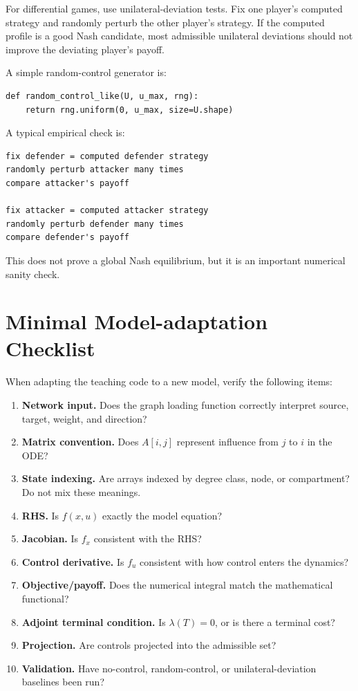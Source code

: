 \documentclass[11pt,a4paper]{article}
\begin{document}
For differential games, use unilateral-deviation tests. Fix one player's computed strategy and randomly perturb the other player's strategy. If the computed profile is a good Nash candidate, most admissible unilateral deviations should not improve the deviating player's payoff.

A simple random-control generator is:

\begin{lstlisting}[style=py]
def random_control_like(U, u_max, rng):
    return rng.uniform(0, u_max, size=U.shape)
\end{lstlisting}

A typical empirical check is:

\begin{lstlisting}[style=text]
fix defender = computed defender strategy
randomly perturb attacker many times
compare attacker's payoff

fix attacker = computed attacker strategy
randomly perturb defender many times
compare defender's payoff
\end{lstlisting}

This does not prove a global Nash equilibrium, but it is an important numerical sanity check.

\section{Minimal Model-adaptation Checklist}

When adapting the teaching code to a new model, verify the following items:

\begin{enumerate}
  \item \textbf{Network input.} Does the graph loading function correctly interpret source, target, weight, and direction?
  \item \textbf{Matrix convention.} Does \(A[i,j]\) represent influence from \(j\) to \(i\) in the ODE?
  \item \textbf{State indexing.} Are arrays indexed by degree class, node, or compartment? Do not mix these meanings.
  \item \textbf{RHS.} Is \(f(x,u)\) exactly the model equation?
  \item \textbf{Jacobian.} Is \(f_x\) consistent with the RHS?
  \item \textbf{Control derivative.} Is \(f_u\) consistent with how control enters the dynamics?
  \item \textbf{Objective/payoff.} Does the numerical integral match the mathematical functional?
  \item \textbf{Adjoint terminal condition.} Is \(\lambda(T)=0\), or is there a terminal cost?
  \item \textbf{Projection.} Are controls projected into the admissible set?
  \item \textbf{Validation.} Have no-control, random-control, or unilateral-deviation baselines been run?
\end{enumerate}
\end{document}
